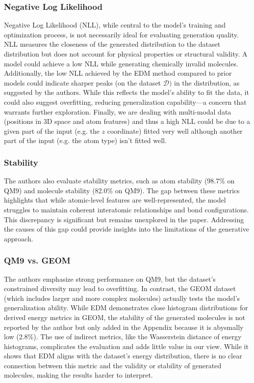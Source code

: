 \documentclass[sigconf]{acmart}
\begin{document}
\subsubsection{Negative Log Likelihood}
Negative Log Likelihood (NLL), while central to the model’s training and optimization process, is not necessarily ideal for evaluating generation quality. NLL measures the closeness of the generated distribution to the dataset distribution but does not account for physical properties or structural validity. A model could achieve a low NLL while generating chemically invalid molecules. Additionally, the low NLL achieved by the EDM method compared to prior models could indicate sharper peaks (on the dataset $\mathcal{D})$ in the distribution, as suggested by the authors. While this reflects the model's ability to fit the data, it could also suggest overfitting, reducing generalization capability—a concern that warrants further exploration. Finally, we are dealing with multi-modal data (positions in 3D space and atom features) and thus a high NLL could be due to a given part of the input (e.g. the $z$ coordinate) fitted very well although another part of the input (e.g. the atom type) isn't fitted well.

\subsubsection{Stability}
The authors also evaluate stability metrics, such as atom stability (98.7\% on QM9) and molecule stability (82.0\% on QM9). The gap between these metrics highlights that while atomic-level features are well-represented, the model struggles to maintain coherent interatomic relationships and bond configurations. This discrepancy is significant but remains unexplored in the paper. Addressing the causes of this gap could provide insights into the limitations of the generative approach.

\subsubsection{QM9 vs. GEOM}
The authors emphasize strong performance on QM9, but the dataset's constrained diversity may lead to overfitting. In contrast, the GEOM dataset (which includes larger and more complex molecules) actually tests the model’s generalization ability. While EDM demonstrates close histogram distributions for derived energy metrics in GEOM, the stability of the generated molecules is not reported by the author but only added in the Appendix because it is abysmally low (2.8\%). The use of indirect metrics, like the Wasserstein distance of energy histograms, complicates the evaluation and adds little value in our view. While it shows that EDM aligns with the dataset’s energy distribution, there is no clear connection between this metric and the validity or stability of generated molecules, making the results harder to interpret.
\end{document}
